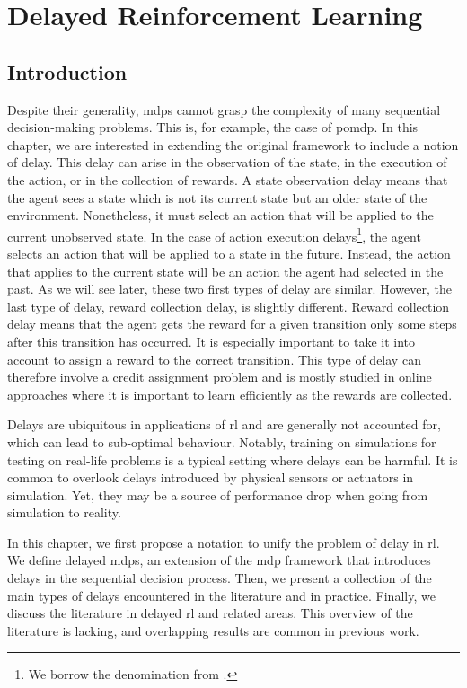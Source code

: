 \chapter{Delayed Reinforcement Learning}
\label{chap:delay}

\section{Introduction}
\label{sec:delay_intro}

Despite their generality, \glspl{mdp} cannot grasp the complexity of many sequential decision-making problems. 
This is, for example, the case of \gls{pomdp}.
In this chapter, we are interested in extending the original framework to include a notion of delay. 
This delay can arise in the observation of the state, in the execution of the action, or in the collection of rewards.
A state observation delay means that the agent sees a state which is not its current state but an older state of the environment.
Nonetheless, it must select an action that will be applied to the current unobserved state. 
In the case of action execution delays\footnote{We borrow the denomination from \cite{derman2021acting}.}, the agent selects an action that will be applied to a state in the future. 
Instead, the action that applies to the current state will be an action the agent had selected in the past. 
As we will see later, these two first types of delay are similar. However, the last type of delay, reward collection delay, is slightly different. 
Reward collection delay means that the agent gets the reward for a given transition only some steps after this transition has occurred. 
It is especially important to take it into account to assign a reward to the correct transition.
This type of delay can therefore involve a credit assignment problem and is mostly studied in online approaches where it is important to learn efficiently as the rewards are collected. 

Delays are ubiquitous in applications of \gls{rl} and are generally not accounted for, which can lead to sub-optimal behaviour. 
Notably, training on simulations for testing on real-life problems is a typical setting where delays can be harmful. 
It is common to overlook delays introduced by physical sensors or actuators in simulation. 
Yet, they may be a source of performance drop when going from simulation to reality. 

In this chapter, we first propose a notation to unify the problem of delay in \gls{rl}.  
We define delayed \glspl{mdp}, an extension of the \gls{mdp} framework that introduces delays in the sequential decision process. 
Then, we present a collection of the main types of delays encountered in the literature and in practice.
Finally, we discuss the literature in delayed \gls{rl} and related areas.
This overview of the literature is lacking, and overlapping results are common in previous work.  



